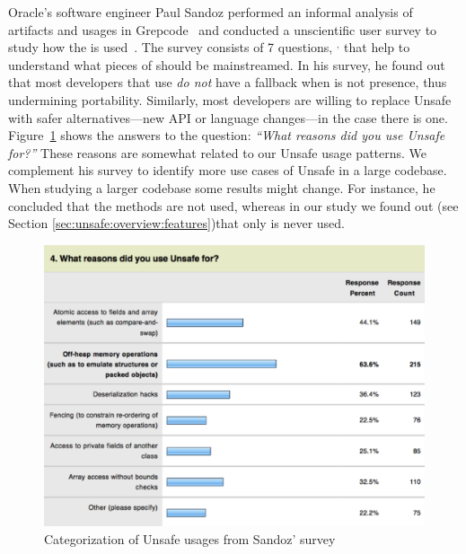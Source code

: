 Oracle's software engineer Paul Sandoz performed an informal analysis of
\mavencentral{} artifacts and usages in Grepcode~\citep{sandoz-personal-communication}
and conducted a unscientific user survey to study how the \unsafe{} \api{} is used~\citep{psandoz14}.
The survey consists of 7 questions,%
%
\(^{,}\)%
that help to understand what pieces of \smu{} should be mainstreamed.
In his survey,
he found out that most developers that use \smu{} \emph{do not} have a fallback when \smu{} is not presence,
thus undermining portability.
Similarly, most developers are willing to replace Unsafe with safer alternatives---new API or language changes---in the case there is one.
Figure~\ref{fig:lr:unsafe4} shows the answers to the question:
\emph{``What reasons did you use Unsafe for?''}
These reasons are somewhat related to our Unsafe usage patterns.
We complement his survey to identify more use cases of Unsafe in a large codebase.
When studying a larger codebase some results might change.
For instance, he concluded that the  methods are not used,
whereas in our study we found out (see Section \ref{sec:unsafe:overview:features})that only  is never used.

\begin{figure}[ht!]
\centering
\includegraphics[width=\textwidth]{Unsafe-Survey-4}
\caption{Categorization of Unsafe usages from Sandoz' survey} \label{fig:lr:unsafe4}
\end{figure}

